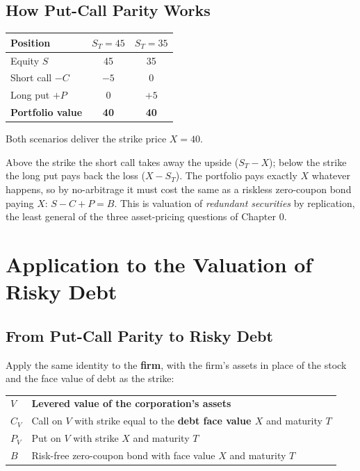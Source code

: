 \subsection{How Put-Call Parity Works}
\begin{exbox}[Example (slide): strike $X=40$, two scenarios for $S_T$ at maturity]
\begin{center}
\begin{tabular}{@{}lcc@{}}
\toprule
\textbf{Position} & $S_T=45$ & $S_T=35$\\
\midrule
Equity $S$ & 45 & 35\\
Short call $-C$ & $-5$ & 0\\
Long put $+P$ & 0 & $+5$\\
\midrule
\textbf{Portfolio value} & \textbf{40} & \textbf{40}\\
\bottomrule
\end{tabular}
\end{center}
Both scenarios deliver the strike price $X=40$.
\end{exbox}
\begin{addbox}
Above the strike the short call takes away the upside ($S_T-X$); below the strike the long put pays back the loss ($X-S_T$). The portfolio pays exactly $X$ whatever happens, so by no-arbitrage it must cost the same as a riskless zero-coupon bond paying $X$: $S-C+P=B$. This is valuation of \emph{redundant securities} by replication, the least general of the three asset-pricing questions of Chapter 0.
\end{addbox}

\section{Application to the Valuation of Risky Debt}

\subsection{From Put-Call Parity to Risky Debt}
Apply the same identity to the \textbf{firm}, with the firm's assets in place of the stock and the face value of debt as the strike:
\begin{center}
\small
\begin{tabular}{@{}lp{11cm}@{}}
\toprule
$V$ & \textbf{Levered value of the corporation's assets}\\
$C_V$ & Call on $V$ with strike equal to the \textbf{debt face value $X$} and maturity $T$\\
$P_V$ & Put on $V$ with strike $X$ and maturity $T$\\
$B$ & Risk-free zero-coupon bond with face value $X$ and maturity $T$\\
\bottomrule
\end{tabular}
\end{center}

